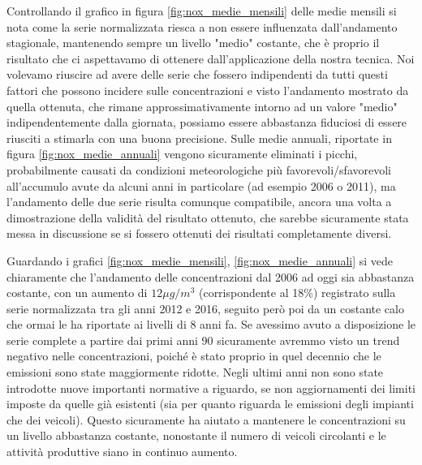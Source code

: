 \documentclass[a4paper]{report}
\begin{document}

Controllando il grafico in figura \ref{fig:nox_medie_mensili} delle medie mensili si nota come la serie normalizzata riesca a non essere influenzata dall'andamento stagionale, mantenendo sempre un livello "medio" costante, che è proprio il risultato che ci aspettavamo di ottenere dall'applicazione della nostra tecnica. Noi volevamo riuscire ad avere delle serie che fossero indipendenti da tutti questi fattori che possono incidere sulle concentrazioni e visto l'andamento mostrato da quella ottenuta, che rimane approssimativamente intorno ad un valore "medio" indipendentemente dalla giornata, possiamo essere abbastanza fiduciosi di essere riusciti a stimarla con una buona precisione.
Sulle medie annuali, riportate in figura \ref{fig:nox_medie_annuali} vengono sicuramente eliminati i picchi, probabilmente causati da condizioni meteorologiche più favorevoli/sfavorevoli all'accumulo avute da alcuni anni in particolare (ad esempio 2006 o 2011), ma l'andamento delle due serie risulta comunque compatibile, ancora una volta a dimostrazione della validità del risultato ottenuto, che sarebbe sicuramente stata messa in discussione se si fossero ottenuti dei risultati completamente diversi.

Guardando
i grafici \ref{fig:nox_medie_mensili}, \ref{fig:nox_medie_annuali} si vede chiaramente che l'andamento delle concentrazioni dal 2006 ad oggi sia abbastanza costante, con un aumento di $12\mu g/m^3$ (corrispondente al 18\%) registrato sulla serie normalizzata tra gli anni 2012 e 2016, seguito però poi da un costante calo che ormai le ha riportate ai livelli di 8 anni fa. Se avessimo avuto a disposizione le serie complete a partire dai primi anni 90 sicuramente avremmo visto un trend negativo nelle concentrazioni, poiché è stato proprio in quel decennio che le emissioni sono state maggiormente ridotte. Negli ultimi anni non sono state introdotte nuove importanti normative a riguardo, se non aggiornamenti dei limiti imposte da quelle già esistenti (sia per quanto riguarda le emissioni degli impianti che dei veicoli). Questo sicuramente ha aiutato a mantenere le concentrazioni su un livello abbastanza costante, nonostante il numero di veicoli circolanti e le attività produttive siano in continuo aumento.
\end{document}
